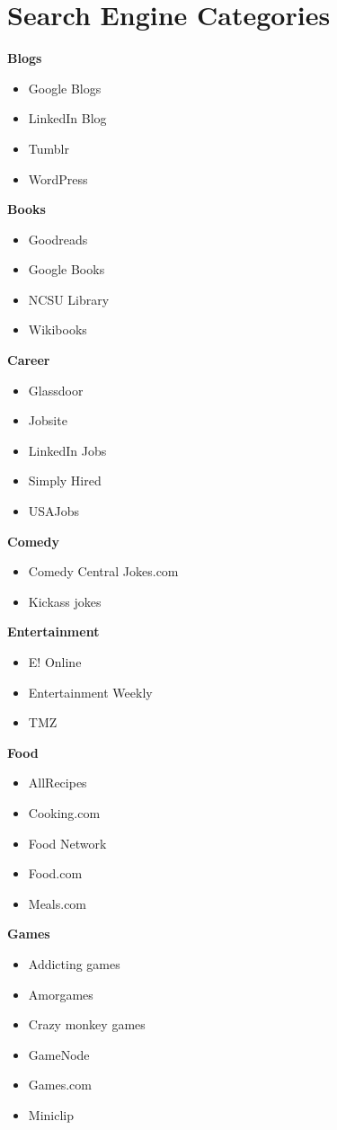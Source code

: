 \section{Search Engine Categories}
\label{app:enginetypes}
\textbf{Blogs}
\begin{itemize}
\item	Google Blogs	
\item	LinkedIn Blog	
\item	Tumblr	
\item	WordPress	
\end{itemize}
\textbf{Books}
\begin{itemize}
\item	Goodreads	
\item	Google Books	
\item	NCSU Library 	
\item	Wikibooks	
\end{itemize}
\textbf{Career}
\begin{itemize}
\item	Glassdoor	
\item	Jobsite	
\item	LinkedIn Jobs	
\item	Simply Hired	
\item	USAJobs	
\end{itemize}
\textbf{Comedy}
\begin{itemize}
\item	Comedy Central Jokes.com	
\item	Kickass jokes	
\end{itemize}
\textbf{Entertainment}
\begin{itemize}
\item	E! Online	
\item	Entertainment Weekly	
\item	TMZ	
\end{itemize}
\textbf{Food}
\begin{itemize}
\item	AllRecipes	
\item	Cooking.com	
\item	Food Network	
\item	Food.com	
\item	Meals.com	
\end{itemize}
\textbf{Games}
\begin{itemize}
\item	Addicting games	
\item	Amorgames	
\item	Crazy monkey games	
\item	GameNode	
\item	Games.com	
\item	Miniclip	
\end{itemize}
